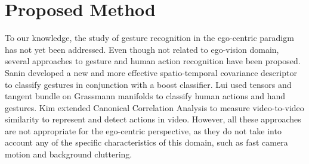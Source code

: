 \section{Proposed Method}
To our knowledge, the study of gesture recognition in the ego-centric paradigm has not yet been addressed. Even though not related to ego-vision domain, several approaches to gesture and human action recognition have been proposed. Sanin \etal \cite{sanin2013spatio} developed a new and more effective spatio-temporal covariance descriptor to classify gestures in conjunction with a boost classifier. Lui \etal \cite{lui2010action, lui2011tangent} used tensors and tangent bundle on Grassmann manifolds to classify human actions and hand gestures. Kim \etal \cite{kim2009canonical} extended Canonical Correlation Analysis to measure video-to-video similarity to represent and detect actions in video. However, all these approaches are not appropriate for the ego-centric perspective, as they do not take into account any of the specific characteristics of this domain, such as fast camera motion and background cluttering.
